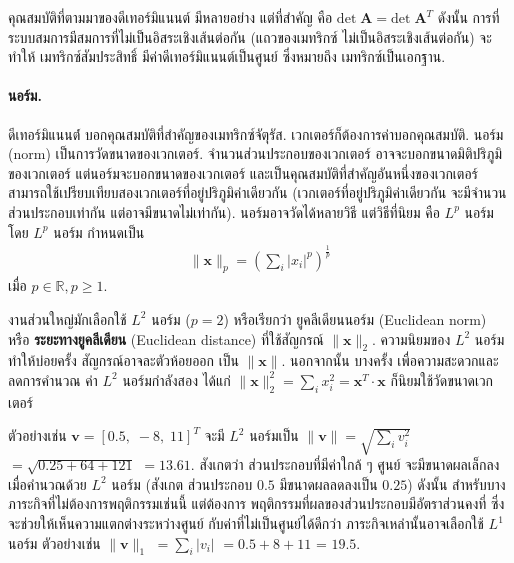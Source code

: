 
คุณสมบัติที่ตามมาของดีเทอร์มิแนนต์ มีหลายอย่าง 
แต่ที่สำคัญ คือ $\mathrm{det}\; \bm{A} = \mathrm{det}\; \bm{A}^T$
ดังนั้น การที่ระบบสมการมีสมการที่ไม่เป็นอิสระเชิงเส้นต่อกัน (แถวของเมทริกซ์ ไม่เป็นอิสระเชิงเส้นต่อกัน) จะทำให้
เมทริกซ์สัมประสิทธิ์ มีค่าดีเทอร์มิแนนต์เป็นศูนย์ ซึ่งหมายถึง เมทริกซ์เป็นเอกฐาน.

\paragraph{นอร์ม.}
ดีเทอร์มิแนนต์่
บอกคุณสมบัติที่สำคัญของเมทริกซ์จัตุรัส.
เวกเตอร์ก็ต้องการค่าบอกคุณสมบัติ.
นอร์ม (norm) เป็นการวัดขนาดของเวกเตอร์.
จำนวนส่วนประกอบของเวกเตอร์ อาจจะบอกขนาดมิติปริภูมิของเวกเตอร์
แต่นอร์มจะบอกขนาดของเวกเตอร์
และเป็นคุณสมบัติที่สำคัญอันหนึ่งของเวกเตอร์ สามารถใช้เปรียบเทียบสองเวกเตอร์ที่อยู่ปริภูมิค่าเดียวกัน (เวกเตอร์ที่อยู่ปริภูมิค่าเดียวกัน จะมีจำนวนส่วนประกอบเท่ากัน แต่อาจมีขนาดไม่เท่ากัน).
นอร์มอาจวัดได้หลายวิธี แต่วิธีที่นิยม คือ $L^p$ นอร์ม โดย $L^p$ นอร์ม กำหนดเป็น
\begin{eqnarray}
\|\bm{x}\|_p = \left(\sum_i |x_i|^p \right)^{\frac{1}{p}}
\end{eqnarray}
เมื่อ $p \in \mathbb{R}, p \geq 1$.

งานส่วนใหญ่มักเลือกใช้ $L^2$ นอร์ม ($p=2$) หรือเรียกว่า ยูคลีเดียนนอร์ม (Euclidean norm) หรือ \textbf{ระยะทางยูคลีเดียน} (Euclidean distance)
ที่ใช้สัญกรณ์ $\|\bm{x}\|_2$.
ความนิยมของ $L^2$ นอร์ม
ทำให้บ่อยครั้ง
สัญกรณ์อาจละตัวห้อยออก เป็น $\|\bm{x}\|$.
นอกจากนั้น บางครั้ง เพื่อความสะดวกและลดการคำนวณ
ค่า $L^2$ นอร์มกำลังสอง ได้แก่ $\|\bm{x}\|_2^2 = \sum_i x_i^2 = \bm{x}^T \cdot \bm{x}$ ก็นิยมใช้วัดขนาดเวกเตอร์

ตัวอย่างเช่น 
$\bm{v} = [0.5,\; -8, \; 11]^T$ จะมี $L^2$ นอร์มเป็น $\|\bm{v}\| = \sqrt{\sum_i v_i^2}$ $= \sqrt{0.25 + 64 + 121}$ $= 13.61$.
สังเกตว่า ส่วนประกอบที่มีค่าใกล้ ๆ ศูนย์ จะมีขนาดผลเล็กลง เมื่อคำนวณด้วย $L^2$ นอร์ม 
(สังเกต ส่วนประกอบ $0.5$ มีขนาดผลลดลงเป็น $0.25$)
ดังนั้น สำหรับบางภาระกิจที่ไม่ต้องการพฤติกรรมเช่นนี้ 
แต่ต้องการ
พฤติกรรมที่ผลของส่วนประกอบมีอัตราส่วนคงที่ 
ซึ่งจะช่วยให้เห็นความแตกต่างระหว่างศูนย์ กับค่าที่ไม่เป็นศูนย์ได้ดีกว่า
ภาระกิจเหล่านั้นอาจเลือกใช้ $L^1$ นอร์ม ตัวอย่างเช่น $\|\bm{v}\|_1$ $= \sum_i |v_i|$ $=0.5 + 8 + 11$ = $19.5$.

